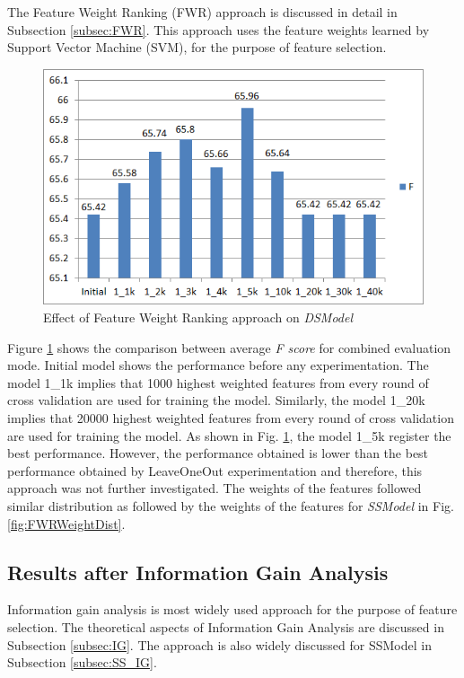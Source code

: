 The Feature Weight Ranking (FWR) approach is discussed in detail in Subsection \ref{subsec:FWR}. This approach uses the feature weights learned by Support Vector Machine (SVM), for the purpose of feature selection.

\begin{figure}
\centering
\includegraphics[scale=0.7]{figures/DSFWRResults.png}
\caption{Effect of Feature Weight Ranking approach on \textit{DSModel}}\label{fig:DSFWR}
\end{figure}

Figure \ref{fig:DSFWR} shows the comparison between average \textit{F score} for combined evaluation mode. Initial model shows the performance before any experimentation. The model 1\_1k implies that 1000 highest weighted features from every round of cross validation are used for training the model. Similarly, the model 1\_20k implies that 20000 highest weighted features from every round of cross validation are used for training the model. As shown in Fig. \ref{fig:DSFWR}, the model 1\_5k register the best performance. However, the performance obtained is lower than the best performance obtained by LeaveOneOut experimentation and therefore, this approach was not further investigated. The weights of the features followed similar distribution as followed by the weights of the features for \textit{SSModel} in Fig. \ref{fig:FWRWeightDist}.

\subsection{Results after Information Gain Analysis}


Information gain analysis is most widely used approach for the purpose of feature selection. The theoretical aspects of Information Gain Analysis are discussed in Subsection \ref{subsec:IG}. The approach is also widely discussed for SSModel in Subsection \ref{subsec:SS_IG}. 


